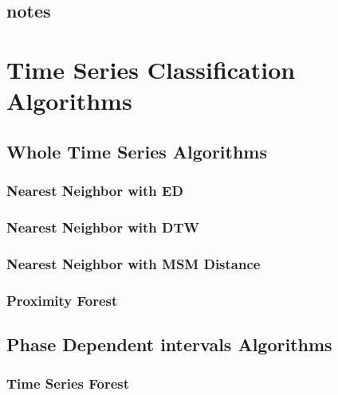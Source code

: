 \subsection{notes}



\null\newpage

\section{Time Series Classification Algorithms}

\subsection{Whole Time Series Algorithms}

\subsubsection{Nearest Neighbor with ED}

\subsubsection{Nearest Neighbor with DTW}

\subsubsection{Nearest Neighbor with MSM Distance}

\subsubsection{Proximity Forest}


\subsection{Phase Dependent intervals Algorithms}

\subsubsection{Time Series Forest}




\null\newpage


